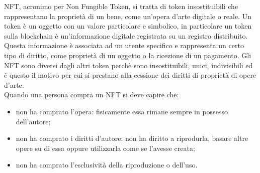 \gls{NFT}, acronimo per Non Fungible Token, si tratta di token insostituibili che rappresentano la proprietà di un bene, come un'opera d'arte digitale o reale. Un token è un oggetto con un valore particolare e simbolico, in particolare un token sulla blockchain è un'informazione digitale registrata su un registro distribuito. Questa informazione è associata ad un utente specifico e rappresenta un certo tipo di diritto, come proprietà di un oggetto o la ricezione di un pagamento. Gli \gls{NFT} sono diversi dagli altri token perchè sono insostituibili, unici, indivisibili ed è questo il motivo per cui si prestano alla cessione dei diritti di proprietà di opere d'arte.\\
Quando una persona compra un \gls{NFT} si deve capire che:
\begin{itemize}
	\item non ha comprato l'opera: fisicamente essa rimane sempre in possesso dell'autore;
	\item non ha comprato i diritti d'autore: non ha diritto a riprodurla, basare altre opere su di essa oppure utilizzarla come se l'avesse creata;
	\item non ha comprato l'esclusività della riproduzione o dell'uso.
\end{itemize}

